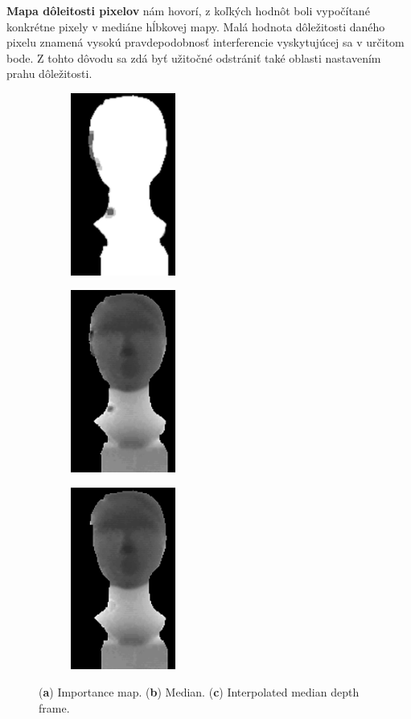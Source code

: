 \textbf{Mapa dôleitosti pixelov} nám hovorí, z koľkých hodnôt boli vypočítané konkrétne pixely v mediáne hĺbkovej mapy.  Malá hodnota dôležitosti daného pixelu znamená vysokú pravdepodobnosť interferencie vyskytujúcej sa v určitom bode. Z tohto dôvodu sa zdá byť užitočné odstrániť také oblasti nastavením prahu dôležitosti. \newline


\begin{figure}[h]
	\centering
	\begin{subfigure}[b]{0.30\textwidth}
		\centering
		\includegraphics[height=6cm]{figures/importance_map-a.png}
		\caption{}
		\label{fig:imap:a}
	\end{subfigure}
	\hfill
	\begin{subfigure}[b]{0.30\textwidth}
		\centering
		\includegraphics[height=6cm]{figures/importance_map-b.png}
		\caption{}
		\label{fig:imap:b}
	\end{subfigure}
	\hfill
	\begin{subfigure}[b]{0.30\textwidth}
		\centering
		\includegraphics[height=6cm]{figures/importance_map-c.png}
		\caption{}
		\label{fig:imap:c}
	\end{subfigure}
	\caption{(\textbf{a}) Importance map. (\textbf{b}) Median. (\textbf{c}) Interpolated median depth frame.}
	\label{fig:imap}
\end{figure}

